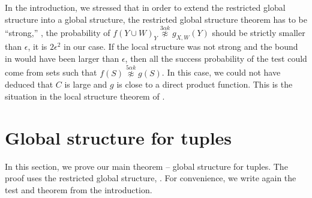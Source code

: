 \documentclass{toc}
\newcommand\f{f} %
\newcommand\setf{f} %
\newcommand{\g}{g} %
\newcommand\pf{g} %
\newcommand\neqg[1]{\stackrel{{#1}}{ \not\approx}} %
\begin{document}
In the introduction, we stressed that in order to extend the restricted global structure into a global structure, the restricted global structure theorem has to be ``strong,'' \ie, the probability of $\f(Y\cup W)_Y \neqg{3\alpha k} \g_{X,W}(Y)$ should be strictly smaller than $\epsilon$, it is $2\epsilon^2$ in our case. If the local structure was not strong and the bound in  would have been larger than $\epsilon$, then all the success probability of the test could come from sets such that $\setf(S)\neqg{5\alpha k}\g(S)$. In this case, we could not have deduced that $C$ is large and $\pf$ is close to a direct product function. This is the situation in the local structure theorem of \cite{dinur2014direct}.

\section{Global structure for tuples}\label{sec:global}
In this section, we prove our main theorem -- global structure for tuples. The proof uses the restricted global structure, .  For convenience, we write again the test and theorem from the introduction.
\end{document}
